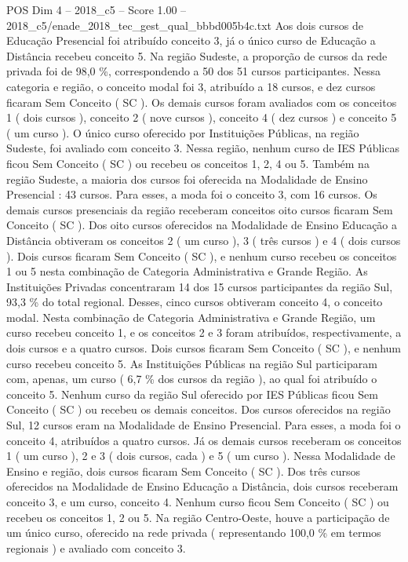 \begin{textsample}{POS Dim 4 – 2018\_c5 – Score 1.00 – 2018\_c5/enade\_2018\_tec\_gest\_qual\_bbbd005b4c.txt}
Aos dois cursos de Educação Presencial foi atribuído conceito 3, já o único curso de Educação a Distância recebeu conceito 5.
Na região Sudeste, a proporção de cursos da rede privada foi de 98,0 \%, correspondendo a 50 dos 51 cursos participantes.
Nessa categoria e região, o conceito modal foi 3, atribuído a 18 cursos, e dez cursos ficaram Sem Conceito ( SC ).
Os demais cursos foram avaliados com os conceitos 1 ( dois cursos ), conceito 2 ( nove cursos ), conceito 4 ( dez cursos ) e conceito 5 ( um curso ).
O único curso oferecido por Instituições Públicas, na região Sudeste, foi avaliado com conceito 3.
Nessa região, nenhum curso de IES Públicas ficou Sem Conceito ( SC ) ou recebeu os conceitos 1, 2, 4 ou 5.
Também na região Sudeste, a maioria dos cursos foi oferecida na Modalidade de Ensino Presencial : 43 cursos.
Para esses, a moda foi o conceito 3, com 16 cursos.
Os demais cursos presenciais da região receberam conceitos oito cursos ficaram Sem Conceito ( SC ).
Dos oito cursos oferecidos na Modalidade de Ensino Educação a Distância obtiveram os conceitos 2 ( um curso ), 3 ( três cursos ) e 4 ( dois cursos ).
Dois cursos ficaram Sem Conceito ( SC ), e nenhum curso recebeu os conceitos 1 ou 5 nesta combinação de Categoria Administrativa e Grande Região.
As Instituições Privadas concentraram 14 dos 15 cursos participantes da região Sul, 93,3 \% do total regional.
Desses, cinco cursos obtiveram conceito 4, o conceito modal.
Nesta combinação de Categoria Administrativa e Grande Região, um curso recebeu conceito 1, e os conceitos 2 e 3 foram atribuídos, respectivamente, a dois cursos e a quatro cursos.
Dois cursos ficaram Sem Conceito ( SC ), e nenhum curso recebeu conceito 5.
As Instituições Públicas na região Sul participaram com, apenas, um curso ( 6,7 \% dos cursos da região ), ao qual foi atribuído o conceito 5.
Nenhum curso da região Sul oferecido por IES Públicas ficou Sem Conceito ( SC ) ou recebeu os demais conceitos.
Dos cursos oferecidos na região Sul, 12 cursos eram na Modalidade de Ensino Presencial.
Para esses, a moda foi o conceito 4, atribuídos a quatro cursos.
Já os demais cursos receberam os conceitos 1 ( um curso ), 2 e 3 ( dois cursos, cada ) e 5 ( um curso ).
Nessa Modalidade de Ensino e região, dois cursos ficaram Sem Conceito ( SC ).
Dos três cursos oferecidos na Modalidade de Ensino Educação a Distância, dois cursos receberam conceito 3, e um curso, conceito 4.
Nenhum curso ficou Sem Conceito ( SC ) ou recebeu os conceitos 1, 2 ou 5.
Na região Centro-Oeste, houve a participação de um único curso, oferecido na rede privada ( representando 100,0 \% em termos regionais ) e avaliado com conceito 3.

\end{textsample}
